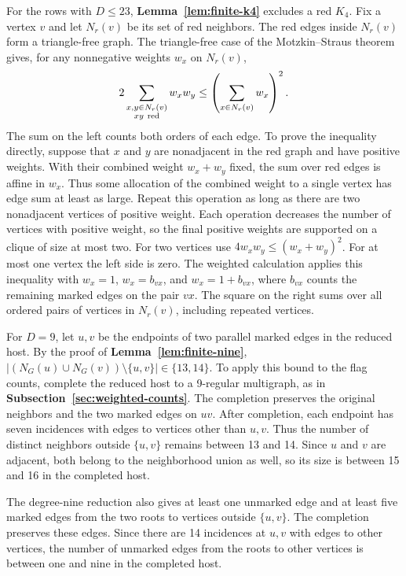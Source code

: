 \documentclass[preprint,11pt,numbers]{elsarticle-arxiv}
\numberwithin{equation}{section}
\theoremstyle{definition}
\begin{document}
\relax\space%
For the rows with $D\leq23$, \textbf{Lemma~\ref{lem:finite-k4}}
excludes a red $K_4$. Fix a vertex $v$ and let $N_r(v)$ be its set of red
neighbors. The red edges inside $N_r(v)$ form a triangle-free
graph. The triangle-free case of the Motzkin--Straus
theorem~\cite{MotzkinStraus1965} gives, for any nonnegative
weights $w_x$ on $N_r(v)$,
\[
 2\sum_{\substack{x,y\in N_r(v)\\xy\ {\rm red}}}w_xw_y
 \le \left(\sum_{x\in N_r(v)} w_x\right)^2.
\]
The sum on the left counts both orders of each edge. To prove the
inequality directly, suppose that $x$ and $y$ are nonadjacent in the
red graph and have positive weights. With their combined weight
$w_x+w_y$ fixed, the sum over red edges is affine in $w_x$. Thus some
allocation of the combined weight to a single vertex has edge sum
at least as large. Repeat this operation as long as there are two
nonadjacent vertices of positive weight. Each operation decreases the
number of vertices with positive weight, so the final positive weights
are supported on a clique of size at most two. For two vertices use
$4w_xw_y\leq(w_x+w_y)^2$. For at most one vertex the left side is zero.
The weighted calculation applies this inequality with $w_x=1$,
$w_x=b_{vx}$, and $w_x=1+b_{vx}$, where $b_{vx}$ counts the remaining
marked edges on the pair $vx$. The square on the right sums over all
ordered pairs of vertices in $N_r(v)$, including repeated vertices.


For $D=9$, let $u,v$ be the endpoints of two parallel marked
edges in the reduced host. By the proof of
\textbf{Lemma~\ref{lem:finite-nine}},
$|(N_G(u)\cup N_G(v))\setminus\{u,v\}|\in\{13,14\}$.
To apply this bound to the flag counts, complete the reduced host
to a 9-regular multigraph, as in
\textbf{Subsection~\ref{sec:weighted-counts}}. The completion preserves
the original neighbors and the two marked edges on $uv$. After
completion, each endpoint has seven incidences with edges to vertices
other than $u,v$. Thus the number of distinct neighbors outside
$\{u,v\}$ remains between 13 and 14. Since $u$ and $v$ are adjacent,
both belong to the neighborhood union as well, so its size is between
15 and 16 in the completed host.

The degree-nine reduction also gives at least one unmarked edge
and at least five marked edges from the two roots to vertices
outside $\{u,v\}$. The completion preserves these edges. Since
there are 14 incidences at $u,v$ with edges to other vertices,
the number of unmarked edges from the roots to other vertices
is between one and nine in the completed host.
\end{document}
